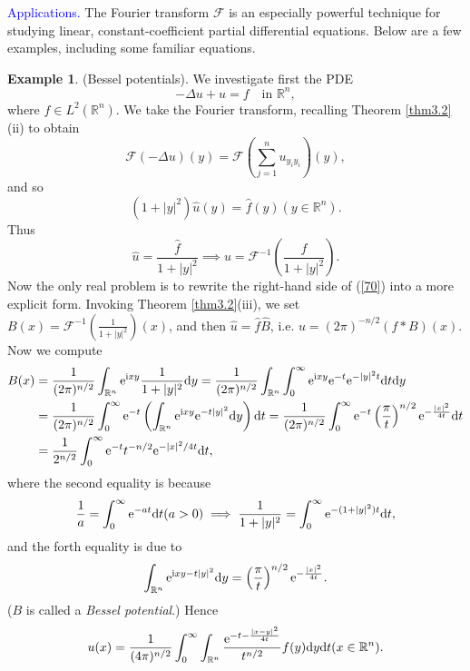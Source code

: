 \documentclass[hyperref,UTF8,12pt]{article}
\numberwithin{equation}{subsection}
\theoremstyle{plain}
\theoremstyle{definition}
\newtheorem{example}{Example}
\numberwithin{theorem}{section}
\numberwithin{lemma}{section}
\numberwithin{proposition}{section}
\numberwithin{remark}{section}
\numberwithin{corollary}{section}
\numberwithin{definition}{section}
\numberwithin{problem}{section}
\numberwithin{example}{section}
\def\e{\textup{e}}
\def\i{\textup{i}}
\def\dif{\textup{d}}
\newcommand{\mr}{\mathbb{R}}
\begin{document}
\noindent\textcolor{blue}{Applications.} The Fourier transform $\mathcal{F}$ is an especially powerful technique for studying linear, constant-coefficient partial differential equations. Below are a few examples, including some familiar equations.
\begin{example}
(Bessel potentials). We investigate first the PDE\[-\Delta u+u=f\quad\text{in }\mr^n,\] where $f\in L^2(\mr^n)$. We take the Fourier transform, recalling Theorem \ref{thm3.2}(ii) to obtain\[\mathcal{F}(-\Delta u)(y)=\mathcal{F}\left(\sum_{j=1}^nu_{y_iy_i}\right) (y),\]and so\[(1+|y|^2)\hat{u}(y)=\hat{f}(y)(y\in\mr^n).\]Thus \[\hat{u}=\frac{\hat{f}}{1+|y|^2}\implies u=\mathcal{F}^{-1} \left(\frac{\hat{f}}{1+|y|^2}\right).\tag{70}\label{70}\]Now the only real problem is to rewrite the right-hand side of (\ref{70}) into a more explicit form. Invoking Theorem \ref{thm3.2}(iii), we set $B(x)=\mathcal{F}^{-1}\left(\frac{1}{1+|y|^2}\right)(x)$, and then $\hat{u}=\hat{f}\hat{B}$, i.e. $u=(2\pi)^{-n/2}(f*B)(x)$. Now we compute
\[\begin{aligned}
	B(x)&=\frac{1}{(2\pi)^{n/2}}\int_{\mr^n}\e^{\i x y}\frac{1}{1+|y|^2}\dif y=\frac{1}{(2\pi)^{n/2}}\int_{\mr^n}\int_0^\infty\e^{\i xy}\e^{-t}\e^{-|y|^2t}\dif t\dif y\\
	&=\frac{1}{(2\pi)^{n/2}}\int_0^\infty\e^{-t}\left(\int_{\mr^n}\e^{\i xy}\e^{-t|y|^2} \dif y\right)\dif t=\frac{1}{(2\pi)^{n/2}}\int_0^\infty\e^{-t}\left(\frac{\pi}{t}\right) ^{n/2}\e^{-\frac{|x|^2}{4t}}\dif t\\
	&=\frac{1}{2^{n/2}}\int_0^\infty\e^{-t}t^{-n/2}\e^{-|x|^2/4t}\dif t,
\end{aligned}\]where the second equality is because \[\frac{1}{a}=\int_0^\infty\e^{-at}\dif t(a>0)\implies\frac{1}{1+|y|^2}=\int_0^\infty\e^{-(1+|y|^2)t}\dif t,\]and the forth equality is due to \[\int_{\mr^n}\e^{\i xy-t|y|^2}\dif y=\left(\frac{\pi}{t}\right)^{n/2} \e^{-\frac{|x|^2}{4t}}.\]($B$ is called a \emph{Bessel potential}.) Hence\[u(x)=\frac{1}{(4\pi)^{n/2}}\int_0^\infty\int_{\mr^n}
\frac{\e^{-t-\frac{|x-y|^2}{4 t}}}{t^{n/2}}f(y)\dif y\dif t(x\in\mr^n).\]
\end{example}
\end{document}
